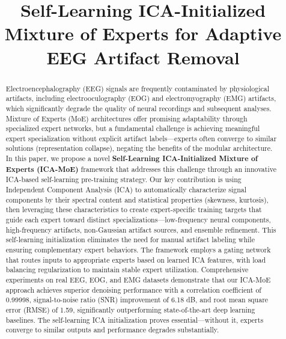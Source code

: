 \documentclass[journal]{IEEEtran}
\begin{document}
\title{Self-Learning ICA-Initialized Mixture of Experts for Adaptive EEG Artifact Removal}

\author{
}

\maketitle

\begin{abstract}
Electroencephalography (EEG) signals are frequently contaminated by physiological artifacts, including electrooculography (EOG) and electromyography (EMG) artifacts, which significantly degrade the quality of neural recordings and subsequent analyses. Mixture of Experts (MoE) architectures offer promising adaptability through specialized expert networks, but a fundamental challenge is achieving meaningful expert specialization without explicit artifact labels---experts often converge to similar solutions (representation collapse), negating the benefits of the modular architecture. In this paper, we propose a novel \textbf{Self-Learning ICA-Initialized Mixture of Experts (ICA-MoE)} framework that addresses this challenge through an innovative ICA-based self-learning pre-training strategy. Our key contribution is using Independent Component Analysis (ICA) to automatically characterize signal components by their spectral content and statistical properties (skewness, kurtosis), then leveraging these characteristics to create expert-specific training targets that guide each expert toward distinct specializations---low-frequency neural components, high-frequency artifacts, non-Gaussian artifact sources, and ensemble refinement. This self-learning initialization eliminates the need for manual artifact labeling while ensuring complementary expert behaviors. The framework employs a gating network that routes inputs to appropriate experts based on learned ICA features, with load balancing regularization to maintain stable expert utilization. Comprehensive experiments on real EEG, EOG, and EMG datasets demonstrate that our ICA-MoE approach achieves superior denoising performance with a correlation coefficient of 0.99998, signal-to-noise ratio (SNR) improvement of 6.18 dB, and root mean square error (RMSE) of 1.59, significantly outperforming state-of-the-art deep learning baselines. The self-learning ICA initialization proves essential---without it, experts converge to similar outputs and performance degrades substantially.
\end{abstract}
\end{document}

